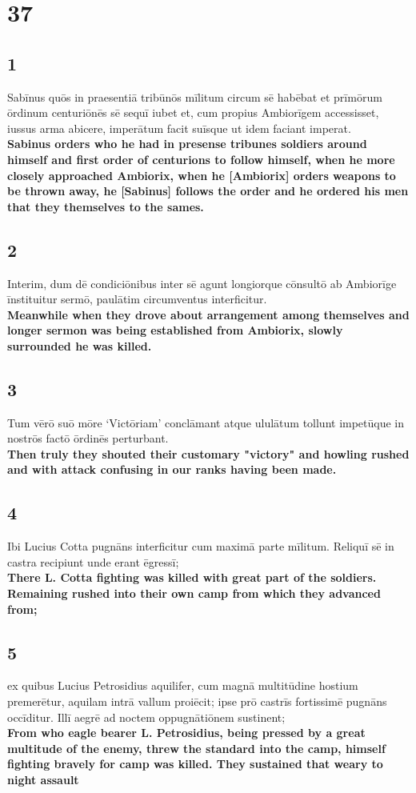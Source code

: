 \documentclass{article}
\begin{document}
\section*{37}

\subsection*{1}
Sabīnus quōs in praesentiā tribūnōs mīlitum circum sē habēbat et prīmōrum ōrdinum centuriōnēs sē sequī iubet et, cum propius Ambiorīgem accessisset, iussus arma abicere, imperātum facit suīsque ut idem faciant imperat.  \\
\textbf{Sabinus orders who he had in presense tribunes soldiers around himself and first order of centurions to follow himself, when he more closely approached Ambiorix, when he [Ambiorix] orders weapons to be thrown away, he [Sabinus] follows the order and he ordered his men that they themselves to the sames.}

\subsection*{2}
Interim, dum dē condiciōnibus inter sē agunt longiorque cōnsultō ab Ambiorīge īnstituitur sermō, paulātim circumventus interficitur. \\
\textbf{Meanwhile when they drove about arrangement among themselves and longer sermon was being established from Ambiorix, slowly surrounded he was killed.}

\subsection*{3}
Tum vērō suō mōre ‘Victōriam’ conclāmant atque ululātum tollunt impetūque in nostrōs factō ōrdinēs perturbant.  \\
\textbf{Then truly they shouted their customary "victory" and howling rushed and with attack confusing in our ranks having been made.}


\subsection*{4}
Ibi Lucius Cotta pugnāns interficitur cum maximā parte mīlitum. Reliquī sē in castra recipiunt unde erant ēgressī; \\
\textbf{There L. Cotta fighting was killed with great part of the soldiers. Remaining rushed into their own camp from which they advanced from;}


\subsection*{5}
ex quibus Lucius Petrosidius aquilifer, cum magnā multitūdine hostium premerētur, aquilam intrā vallum proiēcit; ipse prō castrīs fortissimē pugnāns occīditur. Illī aegrē ad noctem oppugnātiōnem sustinent;  \\
\textbf{From who eagle bearer L. Petrosidius, being pressed by a great multitude of the enemy, threw the standard into the camp, himself fighting bravely for camp was killed. They sustained that weary to night assault}
\end{document}
